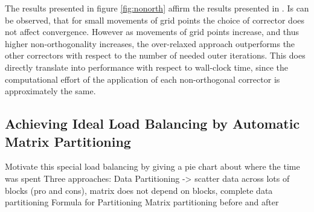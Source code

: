 The results presented in figure \ref{fig:nonorth} affirm the results presented in \cite{jasak96}. Is can be observed, that for small movements of grid points the choice of corrector does not affect convergence. However as movements of grid points increase, and thus higher non-orthogonality increases, the over-relaxed approach outperforms the other correctors with respect to the number of needed outer iterations. This does directly translate into performance with respect to wall-clock time, since the computational effort of the application of each non-orthogonal corrector is approximately the same.

\subsection{Achieving Ideal Load Balancing by Automatic Matrix Partitioning}

Motivate this special load balancing by giving a pie chart about where the time was spent
Three approaches: Data Partitioning -> scatter data across lots of blocks (pro and cons), matrix does not depend on blocks, complete data partitioning
Formula for Partitioning
Matrix partitioning before and after

